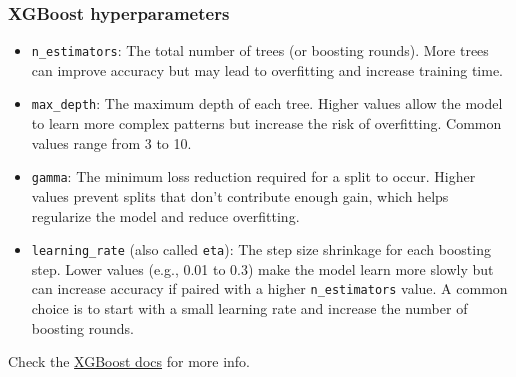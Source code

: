 \documentclass{beamer}
\begin{document}
\begin{frame}
\frametitle{XGBoost hyperparameters}

\small \begin{itemize}
\item \texttt{n\_estimators}: The total number of trees (or boosting rounds). More trees can improve accuracy but may lead to overfitting and increase training time.
\item \texttt{max\_depth}: The maximum depth of each tree. Higher values allow the model to learn more complex patterns but increase the risk of overfitting. Common values range from 3 to 10.
\item \texttt{gamma}: The minimum loss reduction required for a split to occur. Higher values prevent splits that don’t contribute enough gain, which helps regularize the model and reduce overfitting.
\item \texttt{learning\_rate} (also called \texttt{eta}): The step size shrinkage for each boosting step. Lower values (e.g., 0.01 to 0.3) make the model learn more slowly but can increase accuracy if paired with a higher \texttt{n\_estimators} value. A common choice is to start with a small learning rate and increase the number of boosting rounds.
\end{itemize}

Check the \href{https://xgboost.readthedocs.io/en/stable/parameter.html}{XGBoost docs} for more info.

\end{frame}
	
\end{document}
